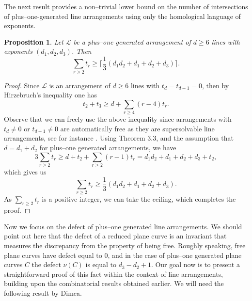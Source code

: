 \documentclass[12pt]{article}
\theoremstyle{plain}
\newtheorem{proposition}[thm]{Proposition}
\theoremstyle{definition}
\begin{document}
The next result provides a non--trivial lower bound on the number of intersections of plus--one-generated line arrangements using only the homological language of exponents.
\begin{proposition}
Let $\mathcal{L}$ be a plus--one generated arrangement of $d\geq 6$ lines with exponents $(d_{1},d_{2},d_{3})$. Then
$$\sum_{r\geq 2} t_{r} \geq \bigg\lceil\frac{1}{3}(d_{1}d_{2} + d_{1}+d_{2}+d_{3})\bigg\rceil.$$
\end{proposition}
\begin{proof}
Since $\mathcal{L}$ is an arrangement of $d\geq 6$ lines with $t_d=t_{d-1}=0$, then by Hirzebruch's inequality \cite{Hirzebruch} one has $$t_{2} + t_{3} \geq d + \sum_{r\geq 4}(r-4)t_{r}.$$
Observe that we can freely use the above inequality since arrangements with $t_{d}\neq 0$ or $t_{d-1}\neq 0$ are automatically free as they are supersolvable line arrangements, see for instance \cite{DS}. Using Theorem 3.3, and the assumption that $d=d_1+d_2$ for plus--one generated arrangements, we have
$$3  \sum_{r\geq 2}t_{r} \geq d+t_{2} + \sum_{r\geq 2}(r-1)t_{r}=d_1d_2+d_1+d_2+d_3+t_2,$$
which gives us
$$\sum_{r\geq 2}{t_r} \geq \frac{1}{3}\left( d_{1}d_{2}+d_{1}+d_{2}+d_{3}\right).$$
As $\sum_{r\geq 2}{t_r}$ is a positive integer, we can take the ceiling, which completes the proof.


\end{proof}
Now we focus on the defect of plus--one generated line arrangements. We should point out here that the defect of a reduced plane curve is an invariant that measures the discrepancy from the property of being free. Roughly speaking, free plane curves have defect equal to $0$, and in the case of plus--one generated plane curves $C$ the defect $\nu(C)$ is equal to $d_{3}-d_{2}+1$. Our goal now is to present a straightforward proof of this fact within the context of line arrangements, building upon the combinatorial results obtained earlier. We will need the following result by Dimca.
\end{document}

